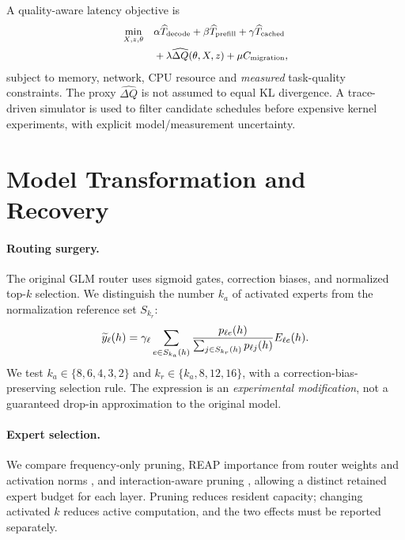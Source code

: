 \documentclass[10pt,twocolumn]{article}
\begin{document}
A quality-aware latency objective is
\begin{equation}
\small
\begin{split}
\min_{X,z,\theta}\quad &\alpha\widehat T_{\mathrm{decode}}+
\beta\widehat T_{\mathrm{prefill}}+\gamma\widehat T_{\mathrm{cached}}\\
&+\lambda\widehat{\Delta Q}(\theta,X,z)+\mu C_{\mathrm{migration}},
\end{split}
\label{eq:joint}
\end{equation}
subject to memory, network, CPU resource and \emph{measured} task-quality constraints. The proxy $\widehat{\Delta Q}$ is not assumed to equal KL divergence. A trace-driven simulator is used to filter candidate schedules before expensive kernel experiments, with explicit model/measurement uncertainty.

\section{Model Transformation and Recovery}
\paragraph{Routing surgery.} The original GLM router uses sigmoid gates, correction biases, and normalized top-$k$ selection. We distinguish the number $k_a$ of activated experts from the normalization reference set $S_{k_r}$:
\begin{equation}
\small
\widetilde{y}_{\ell}(h)=\gamma_{\ell}\sum_{e\in S_{k_a}(h)}\frac{p_{\ell e}(h)}{\sum_{j\in S_{k_r}(h)}p_{\ell j}(h)}E_{\ell e}(h).
\end{equation}
We test $k_a\in\{8,6,4,3,2\}$ and $k_r\in\{k_a,8,12,16\}$, with a correction-bias-preserving selection rule. The expression is an \emph{experimental modification}, not a guaranteed drop-in approximation to the original model.

\paragraph{Expert selection.} We compare frequency-only pruning, REAP importance from router weights and activation norms \cite{reap}, and interaction-aware pruning \cite{hope}, allowing a distinct retained expert budget for each layer. Pruning reduces resident capacity; changing activated $k$ reduces active computation, and the two effects must be reported separately.
\end{document}
